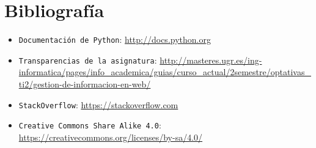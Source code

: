 \chapter{Bibliografía}

\begin{itemize}
\item{\tt Documentación de Python}: \url{http://docs.python.org}
\item{\tt Transparencias de la asignatura}: \url{http://masteres.ugr.es/ing-informatica/pages/info_academica/guias/curso_actual/2semestre/optativas_ti2/gestion-de-informacion-en-web/}
\item{\tt StackOverflow}: \url{https://stackoverflow.com}

\item{\tt Creative Commons Share Alike 4.0}: \url{https://creativecommons.org/licenses/by-sa/4.0/}
\end{itemize}

